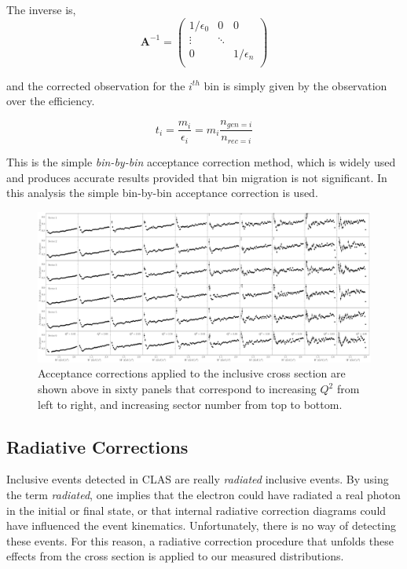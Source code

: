 The inverse is, 
\begin{equation}
  \mathbf{A}^{-1} = \begin{pmatrix}
    1/\epsilon_0 & 0 & 0\\
    \vdots & \ddots \\
    0 &  & 1/\epsilon_n \\
  \end{pmatrix}
\end{equation}

and the corrected observation for the $i^{th}$ bin is simply given by the observation over the efficiency.

\begin{equation}
  t_i = \frac{m_i}{\epsilon_i} = m_i \frac{n_{gen=i}}{n_{rec=i}}
\end{equation}

This is the simple \textit{bin-by-bin} acceptance correction method, which is widely used and produces accurate results provided that bin migration is not significant.  In this analysis the simple bin-by-bin acceptance correction is used.  

\begin{figure}
	\centering
	\label{fig-acceptance-grid} 
	\includegraphics[width=\textwidth]{image/plots/inclusive/acceptance_grid.pdf}
	\caption{Acceptance corrections applied to the inclusive cross section are shown above in sixty panels that correspond to increasing $Q^2$ from left to right, and increasing sector number from top to bottom.  }
\end{figure}

\subsection{Radiative Corrections}

Inclusive events detected in CLAS are really \textit{radiated} inclusive events.  By using the term \textit{radiated}, one implies that the electron could have radiated a real photon in the initial or final state, or that internal radiative correction diagrams could have influenced the event kinematics.  Unfortunately, there is no way of detecting these events.  For this reason, a radiative correction procedure that unfolds these effects from the cross section is applied to our measured distributions.  \\

